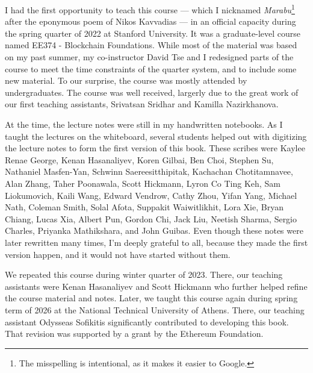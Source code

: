 %
I had the first opportunity to teach this course --- which I nicknamed
\emph{Marabu}\footnote{The misspelling is intentional, as it makes it easier to Google.}
after the eponymous poem of Nikos Kavvadias --- in an official capacity during the
spring quarter of 2022 at Stanford University. It was a graduate-level course
named EE374 - Blockchain Foundations. While most of the material was
based on my past summer, my co-instructor David Tse and I redesigned
parts of the course to meet the time constraints of the quarter system,
and to include some new material. To our surprise, the course was mostly
attended by undergraduates.
The course was well received,
largerly due to the great work of our first teaching assistants,
Srivatsan Sridhar and Kamilla Nazirkhanova.

At the time, the lecture notes were still
in my handwritten notebooks. As I taught the lectures on the whiteboard,
several students helped out with digitizing the lecture notes to
form the first version of this book. These scribes were
Kaylee Renae George, Kenan Hasanaliyev, Koren Gilbai,
Ben Choi, Stephen Su, Nathaniel Masfen-Yan,
Schwinn Saereesitthipitak, Kachachan Chotitamnavee, Alan Zhang,
Taher Poonawala, Scott Hickmann,
Lyron Co Ting Keh, Sam Liokumovich,
Kaili Wang,
Edward Vendrow, Cathy Zhou,
Yifan Yang,
Michael Nath, Coleman Smith,
Solal Afota,
Suppakit Waiwitlikhit, Lora Xie,
Bryan Chiang, Lucas Xia,
Albert Pun, Gordon Chi,
Jack Liu,
Neetish Sharma, Sergio Charles,
Priyanka Mathikshara, and John Guibas.
Even though these notes were later rewritten many times,
I'm deeply grateful to all, because they made the first version happen,
and it would not have started without them.

We repeated this course during winter quarter of 2023.
There, our teaching assistants were Kenan Hasanaliyev
and Scott Hickmann who further helped refine the course material and notes.
Later, we taught this course again during spring term of 2026
at the National Technical University of Athens. There,
our teaching assistant Odysseas Sofikitis significantly contributed
to developing this book. That revision was supported by a grant
by the Ethereum Foundation.


